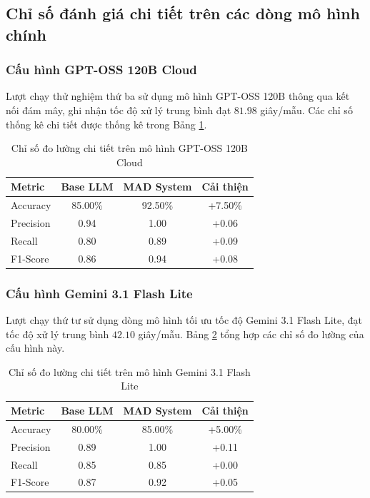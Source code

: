 \documentclass[12pt,a4paper]{report}
\begin{document}
\subsection{Chỉ số đánh giá chi tiết trên các dòng mô hình chính}

\subsubsection{Cấu hình GPT-OSS 120B Cloud}
Lượt chạy thử nghiệm thứ ba sử dụng mô hình GPT-OSS 120B thông qua kết nối đám mây, ghi nhận tốc độ xử lý trung bình đạt $81.98$ giây/mẫu. Các chỉ số thống kê chi tiết được thống kê trong Bảng \ref{tab:gpt_oss_metrics}.

\begin{table}[htbp]
    \centering
    \caption{Chỉ số đo lường chi tiết trên mô hình GPT-OSS 120B Cloud}
    \label{tab:gpt_oss_metrics}
    \begin{tabular}{|l|c|c|c|}
        \hline
        \textbf{Metric} & \textbf{Base LLM} & \textbf{MAD System} & \textbf{Cải thiện} \\
        \hline
        Accuracy & 85.00\% & 92.50\% & +7.50\% \\
        Precision & 0.94 & 1.00 & +0.06 \\
        Recall & 0.80 & 0.89 & +0.09 \\
        F1-Score & 0.86 & 0.94 & +0.08 \\
        \hline
    \end{tabular}
\end{table}

\subsubsection{Cấu hình Gemini 3.1 Flash Lite}
Lượt chạy thứ tư sử dụng dòng mô hình tối ưu tốc độ Gemini 3.1 Flash Lite, đạt tốc độ xử lý trung bình $42.10$ giây/mẫu. Bảng \ref{tab:gemini_flash_metrics} tổng hợp các chỉ số đo lường của cấu hình này.

\begin{table}[htbp]
    \centering
    \caption{Chỉ số đo lường chi tiết trên mô hình Gemini 3.1 Flash Lite}
    \label{tab:gemini_flash_metrics}
    \begin{tabular}{|l|c|c|c|}
        \hline
        \textbf{Metric} & \textbf{Base LLM} & \textbf{MAD System} & \textbf{Cải thiện} \\
        \hline
        Accuracy & 80.00\% & 85.00\% & +5.00\% \\
        Precision & 0.89 & 1.00 & +0.11 \\
        Recall & 0.85 & 0.85 & +0.00 \\
        F1-Score & 0.87 & 0.92 & +0.05 \\
        \hline
    \end{tabular}
\end{table}
\end{document}
